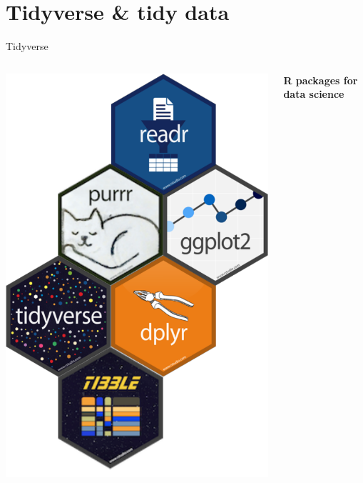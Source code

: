\documentclass[14pt,ignorenonframetext,]{bredelebeamer}
\begin{document}
\begin{frame}
\tableofcontents[hideallsubsections]
\end{frame}

\section{Tidyverse \& tidy data}\label{tidyverse-tidy-data}

\begin{frame}[fragile]{Tidyverse}

\begin{columns}
    \begin{column}{0.3\textwidth}
\includegraphics{images/Tidyverse.pdf}
    \end{column}
    \begin{column}{0.7\textwidth}
    \begin{Huge}
        \textbf{R packages for data science}
    \end{Huge}
    

\end{column}
\end{columns}
\end{frame}
\end{document}
